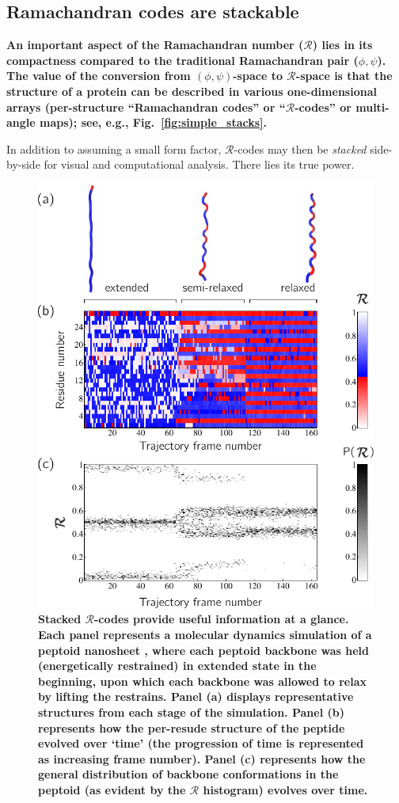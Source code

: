 \documentclass[fleqn,10pt,lineno]{wlpeerj} %
\newcommand{\Fig}[1]{Fig.~\ref{#1}}
\newcommand{\n}[1]{{\textbf{\color{red}#1}}}
\newcommand{\rr}{$\mathcal{R}$\xspace}
\begin{document}

\subsection*{Ramachandran codes are stackable}

\n{An important aspect of the Ramachandran number ($\mathcal{R}$) lies in its compactness compared to the traditional Ramachandran pair ($\phi,\psi$). The value of the conversion from $(\phi,\psi)$-space to \rr-space is that the structure of a protein can be described in various one-dimensional arrays (per-structure ``Ramachandran codes'' or ``$\mathcal{R}$-codes'' or multi-angle maps); see, e.g., \Fig{fig:simple_stacks}.} 

In addition to assuming a small form factor, $\mathcal{R}$-codes may then be \textit{stacked} side-by-side for visual and computational analysis. There lies its true power.


\begin{figure}[t!]
\centering
\includegraphics[width=0.65\linewidth]{figures/nano_r_demo.pdf}
\caption{\textbf{Stacked $\mathcal{R}$-codes provide useful information at a glance.} \n{Each panel represents a molecular dynamics simulation of a peptoid nanosheet \citep{Mannige2016}, where  each peptoid backbone was held (energetically restrained) in extended state in the beginning, upon which each backbone was allowed to relax by lifting the restrains. Panel (a) displays representative structures from each stage of the simulation. Panel (b) represents how the per-resude structure of the peptide evolved over `time' (the progression of time is represented as increasing frame number). Panel (c) represents how the general distribution of backbone conformations in the peptoid (as evident by the \rr histogram) evolves over time.}\label{fig:complex_stacks}} 
\end{figure}
\end{document}
